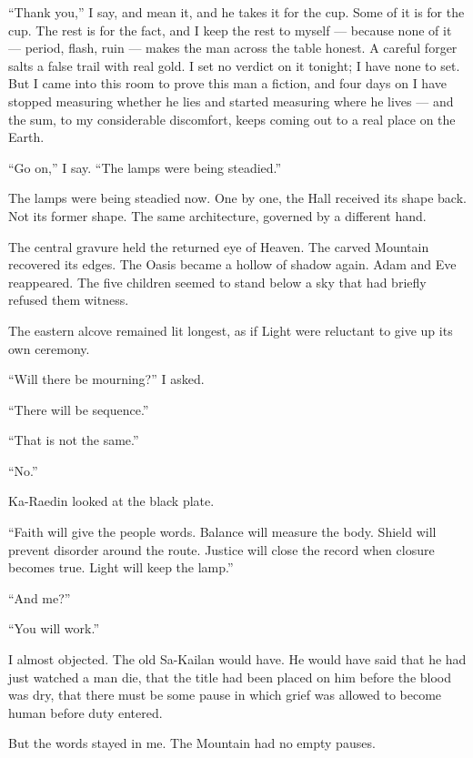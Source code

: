 ``Thank you,'' I say, and mean it, and he takes it for the cup. Some of it is for the cup. The rest is for the fact, and I keep the rest to myself --- because none of it --- period, flash, ruin --- makes the man across the table honest. A careful forger salts a false trail with real gold. I set no verdict on it tonight; I have none to set. But I came into this room to prove this man a fiction, and four days on I have stopped measuring whether he lies and started measuring where he lives --- and the sum, to my considerable discomfort, keeps coming out to a real place on the Earth.\par

``Go on,'' I say. ``The lamps were being steadied.''\par

\ornament

The lamps were being steadied now.
One by one, the Hall received its shape back.
Not its former shape.
The same architecture, governed by a different hand.\par
The central gravure held the returned eye of Heaven.
The carved Mountain recovered its edges.
The Oasis became a hollow of shadow again.
Adam and Eve reappeared.
The five children seemed to stand below a sky that had briefly refused them witness.\par
The eastern alcove remained lit longest, as if Light were reluctant to give up its own ceremony.\par
``Will there be mourning?'' I asked.\par
``There will be sequence.''\par
``That is not the same.''\par
``No.''\par
Ka-Raedin looked at the black plate.\par
``Faith will give the people words.
Balance will measure the body.
Shield will prevent disorder around the route.
Justice will close the record when closure becomes true.
Light will keep the lamp.''\par
``And me?''\par
``You will work.''\par
I almost objected.
The old Sa-Kailan would have.
He would have said that he had just watched a man die, that the title had been placed on him before the blood was dry, that there must be some pause in which grief was allowed to become human before duty entered.\par
But the words stayed in me.
The Mountain had no empty pauses.
